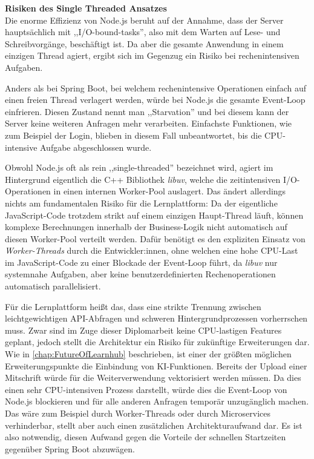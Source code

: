 \vspace{0.7cm}
\textbf{Risiken des Single Threaded Ansatzes} \\
Die enorme Effizienz von Node.js beruht auf der Annahme, dass der Server hauptsächlich mit ,,I/O-bound-tasks'', also mit dem Warten auf Lese- und Schreibvorgänge, beschäftigt ist. Da aber die gesamte Anwendung in einem einzigen Thread agiert, ergibt sich im Gegenzug ein Risiko bei rechenintensiven Aufgaben.

Anders als bei Spring Boot, bei welchem rechenintensive Operationen einfach auf einen freien Thread verlagert werden, würde bei Node.js die gesamte Event-Loop einfrieren. Diesen Zustand nennt man ,,Starvation'' und bei diesem kann der Server keine weiteren Anfragen mehr verarbeiten. Einfachste Funktionen, wie zum Beispiel der Login, blieben in diesem Fall unbeantwortet, bis die CPU-intensive Aufgabe abgeschlossen wurde. \cite{NodeJsBlockingTheEventLoop}

Obwohl Node.js oft als rein ,,single-threaded'' bezeichnet wird, agiert im Hintergrund eigentlich die C++ Bibliothek \textit{libuv}, welche die zeitintensiven I/O-Operationen in einen internen Worker-Pool auslagert. Das ändert allerdings nichts am fundamentalen Risiko für die Lernplattform: Da der eigentliche JavaScript-Code trotzdem strikt auf einem einzigen Haupt-Thread läuft, können komplexe Berechnungen innerhalb der Business-Logik nicht automatisch auf diesen Worker-Pool verteilt werden. Dafür benötigt es den expliziten Einsatz von \textit{Worker-Threads} durch die Entwickler:innen, ohne welchen eine hohe CPU-Last im JavaScript-Code zu einer Blockade der Event-Loop führt, da \textit{libuv} nur systemnahe Aufgaben, aber keine benutzerdefinierten Rechenoperationen automatisch parallelisiert. \cite{NodeJsSingleThreadedAndMultiThreaded} \cite{NodeJsDontBlockEventLoop}

Für die Lernplattform heißt das, dass eine strikte Trennung zwischen leichtgewichtigen API-Abfragen und schweren Hintergrundprozessen vorherrschen muss. Zwar sind im Zuge dieser Diplomarbeit keine CPU-lastigen Features geplant, jedoch stellt die Architektur ein Risiko für zukünftige Erweiterungen dar. Wie in \autoref{chap:FutureOfLearnhub} beschrieben, ist einer der größten möglichen Erweiterungspunkte die Einbindung von KI-Funktionen. Bereits der Upload einer Mitschrift würde für die Weiterverwendung vektorisiert werden müssen. Da dies einen sehr CPU-intensiven Prozess darstellt, würde dies die Event-Loop von Node.js blockieren und für alle anderen Anfragen temporär unzugänglich machen. Das wäre zum Beispiel durch Worker-Threads oder durch Microservices verhinderbar, stellt aber auch einen zusätzlichen Architekturaufwand dar. Es ist also notwendig, diesen Aufwand gegen die Vorteile der schnellen Startzeiten gegenüber Spring Boot abzuwägen.

